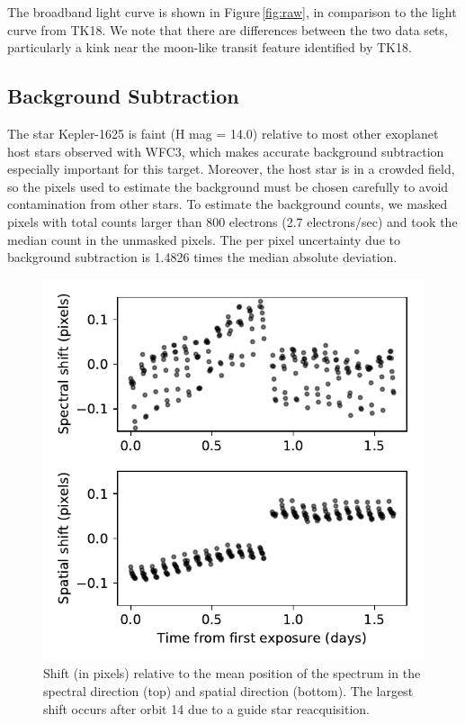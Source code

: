 \documentclass[twocolumn,trackchanges]{aastex62}
\begin{document}
The broadband light curve is shown in Figure\,\ref{fig:raw}, in comparison to the light curve from TK18. We note that there are differences between the two data sets, particularly a kink near the moon-like transit feature identified by TK18.



\subsection{Background Subtraction} 
\label{sec:background} 
The star Kepler-1625 is faint (H mag = 14.0) relative to most other exoplanet host stars observed with WFC3, which makes accurate background subtraction especially important for this target. Moreover, the host star is in a crowded field, so the pixels used to estimate the background must be chosen carefully to avoid contamination from other stars.  To estimate the background counts, we masked pixels with total counts larger than 800 electrons (2.7 electrons/sec) and took the median count in the unmasked pixels. The per pixel uncertainty due to background subtraction is 1.4826 times the median absolute deviation.




\begin{figure}
\includegraphics[width = 0.5 \textwidth]{fig1_shifts.pdf}
    \caption{Shift (in pixels) relative to the mean position of the spectrum in the spectral direction (top) and spatial direction (bottom). The largest shift occurs after orbit 14 due to a guide star reacquisition.}
\label{fig:shifts}
\end{figure}
\end{document}
